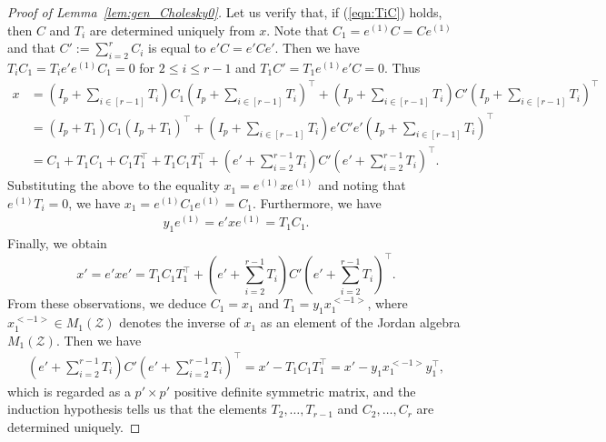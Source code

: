 \documentclass[12pt]{amsart}
\theoremstyle{plain}
\theoremstyle{definition}
\theoremstyle{remark}
\newcommand{\1}{\mathbf{1}}
\newcommand{\Delete}[1]{\textcolor{yellow}{[To Be Deleted]#1}}
\newcommand{\mytransp}[1]{ #1^{\top}}
\begin{document}
\begin{proof}[Proof of Lemma~\ref{lem:gen_Cholesky0}]
Let us verify that, if (\ref{eqn:TiC}) holds, 
 then $C$ and $T_i$ are determined uniquely from $x$.
Note that $C_1 = e^{(1)} C = C e^{(1)}$ and 
 that $C' := \sum_{i=2}^r C_i$ is equal to $e' C =  e'C e'$.
Then we have 
 $T_i C_1 = T_i e' e^{(1)} C_1 = 0$ for $2 \le i \le r-1$
 and $T_1 C' = T_1 e^{(1)} e' C = 0$.
Thus
\begin{equation} \label{eqn:TiCTi}
\begin{aligned}
 x &= (I_p+ \sum_{i\in[r-1]} T_i) C_1 \mytransp{ (I_p + \sum_{i\in[r-1]} T_i)}
        +(I_p+ \sum_{i\in[r-1]} T_i) C' \mytransp{ (I_p + \sum_{i\in[r-1]} T_i)}\\
&= (I_p+T_1) C_1 \mytransp{ (I_p +T_1)}
        +(I_p+ \sum_{i\in[r-1]} T_i) e' C' e' \mytransp{ (I_p + \sum_{i\in[r-1]} T_i)}\\
&= C_1+T_1 C_1 + C_1 \mytransp{T_1} + T_1 C_1 \mytransp{T_1}
        +(e' + \sum_{i=2}^{r-1} T_i) C' \mytransp{ (e' + \sum_{i=2}^{r-1} T_i)}.
\end{aligned}
\end{equation}
Substituting the above to the equality $x_1 =e^{(1)} x e^{(1)}$ 
 and noting that $e^{(1)} T_i = 0$,
 we have   
 $x_1  = e^{(1)} C_1 e^{(1)} = C_1$.
Furthermore, we have
\begin{align*}
  y_1 e^{(1)} = e' x e^{(1)} = T_1 C_1. 
\end{align*}     
Finally, we obtain
 $$
 x' = e' x e' = T_1 C_1 \mytransp{T_1} + (e' + \sum_{i=2}^{r-1} T_i) C' \mytransp{ (e' + \sum_{i=2}^{r-1} T_i)}.
$$
From these observations, 
 we deduce %
  $C_1 = x_1$ and $T_1 = y_1 x_1^{<-1>}$,
 where
 $x_1^{<-1>} \in M_1(\mathcal{Z})$ denotes the inverse of $x_1$ as an element of the Jordan algebra $M_1(\mathcal{Z})$.
 Then we have
 \begin{align*}
 (e' + \sum_{i=2}^{r-1} T_i) C' \mytransp{ (e' + \sum_{i=2}^{r-1} T_i)}
 = x' - T_1 C_1  \mytransp{T_1}
 = x' - y_1 x_1^{<-1>} \mytransp{y_1},
 \end{align*}
 which is regarded as a $p' \times p'$ positive definite symmetric matrix,
 and the induction hypothesis tells us that
 the elements $T_2, \dots, T_{r-1}$ and $C_2, \dots, C_r$ are determined uniquely.


\end{proof}
\end{document}
